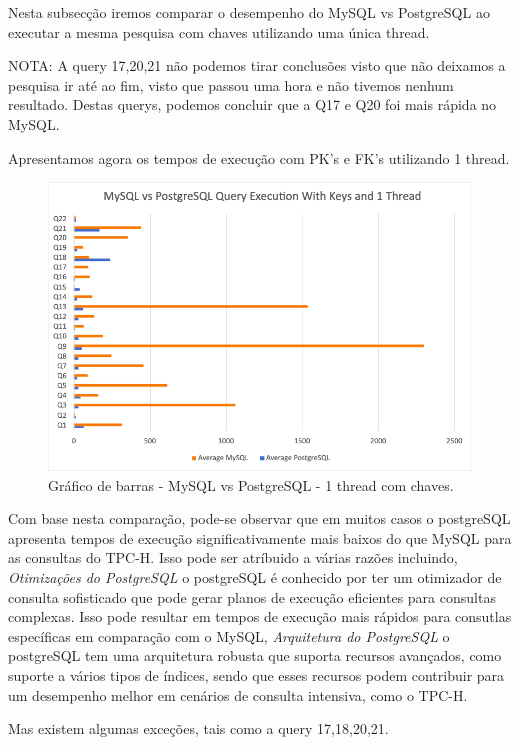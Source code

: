 \documentclass{article}
\begin{document}
Nesta subsecção iremos comparar o desempenho do MySQL vs PostgreSQL ao executar a mesma pesquisa com chaves utilizando uma única thread.


NOTA: A query 17,20,21 não podemos tirar conclusões visto que não deixamos a pesquisa ir até ao fim, visto que passou uma hora e não tivemos nenhum resultado. Destas querys, podemos concluir que a Q17 e Q20 foi mais rápida no MySQL.


Apresentamos agora os tempos de execução com PK's e FK's utilizando 1 thread.
\begin{figure}[H]
  \centering
  \includegraphics[width=\textwidth]{Graphs/mysqlvspostgresql_withkeys_onethread.png}
  \caption{Gráfico de barras - MySQL vs PostgreSQL - 1 thread com chaves.}
  \label{fig:PKCreation2}
\end{figure}
\quad Com base nesta comparação, pode-se observar que em muitos casos o postgreSQL apresenta tempos de execução significativamente mais baixos do que MySQL para as consultas do TPC-H. Isso pode ser atríbuido a várias razões incluindo, \textit{Otimizações do PostgreSQL} o postgreSQL é conhecido por ter um otimizador de consulta sofisticado que pode gerar planos de execução eficientes para consultas complexas. Isso pode resultar em tempos de execução mais rápidos para consutlas específicas em comparação com o MySQL, \textit{Arquitetura do PostgreSQL} o postgreSQL tem uma arquitetura robusta que suporta recursos avançados, como suporte a vários tipos de índices, sendo que esses recursos podem contribuir para um desempenho melhor em cenários de consulta intensiva, como o TPC-H.

\quad Mas existem algumas exceções, tais como a query 17,18,20,21.
\end{document}
